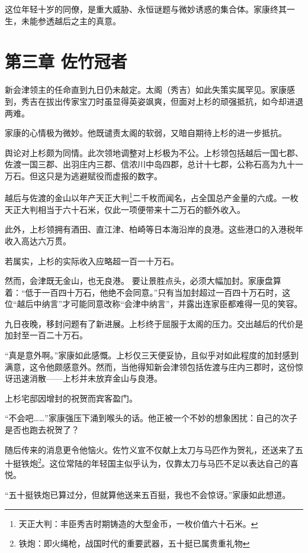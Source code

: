 \documentclass[
]{article}
\begin{document}
这位年轻十岁的同僚，是重大威胁、永恒谜题与微妙诱惑的集合体。家康终其一生，未能参透越后之主的真意。

\section*{第三章 佐竹冠者}\label{ux7b2cux4e09ux7ae0-ux4f50ux7af9ux51a0ux8005}

新会津领主的任命直到九日仍未敲定。太阁（秀吉）如此失策实属罕见。家康感到，秀吉在拔出传家宝刀时虽显得英姿飒爽，但面对上杉的顽强抵抗，如今却进退两难。

家康的心情极为微妙。他既谴责太阁的软弱，又暗自期待上杉的进一步抵抗。

舆论对上杉颇为同情。此次领地调整对上杉极为不公。上杉领包括越后一国七郡、佐渡一国三郡、出羽庄内三郡、信浓川中岛四郡，总计十七郡，公称石高为九十一万石。但这只是为逃避赋役而虚报的数字。

越后与佐渡的金山以年产天正大判\footnote{天正大判：丰臣秀吉时期铸造的大型金币，一枚价值六十石米。}二千枚而闻名，占全国总产金量的六成。一枚天正大判相当于六十石米，仅此一项便带来十二万石的额外收入。

此外，上杉领拥有酒田、直江津、柏崎等日本海沿岸的良港。这些港口的入港税年收入高达六万贯。

若属实，上杉的实际收入应略超一百一十万石。

然而，会津既无金山，也无良港。
要让景胜点头，必须大幅加封。家康盘算着：``低于一百四十万石，他绝不会同意。''只有当加封超过一百四十万石时，这位``越后中纳言''才可能同意改称``会津中纳言''，并露出连家臣都难得一见的笑容。

九日夜晚，移封问题有了新进展。上杉终于屈服于太阁的压力。交出越后的代价是加封至一百二十万石。

``真是意外啊。''家康如此感慨。上杉仅三天便妥协，且似乎对如此程度的加封感到满意，这令他颇感意外。然而，当他得知新会津领包括佐渡与庄内三郡时，这份惊讶迅速消散------上杉并未放弃金山与良港。

上杉宅邸因增封的祝贺而宾客盈门。

``不会吧\ldots\ldots{}''家康强压下涌到喉头的话。他正被一个不妙的想象困扰：自己的次子是否也跑去祝贺了？

随后传来的消息更令他恼火。佐竹义宣不仅献上太刀与马匹作为贺礼，还送来了五十挺铁炮\footnote{铁炮：即火绳枪，战国时代的重要武器，五十挺已属贵重礼物}。这位常陆的年轻国主似乎认为，仅靠太刀与马匹不足以表达自己的喜悦。

``五十挺铁炮已算过分，但就算他送来五百挺，我也不会惊讶。''家康如此想道。
\end{document}
